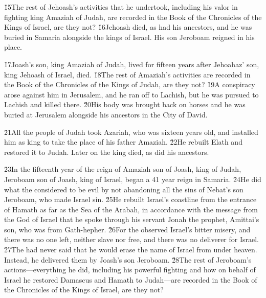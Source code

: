 \v{15}The rest of Jehoash's activities that he undertook, including his valor in fighting king Amaziah of Judah, are recorded in the Book of the Chronicles of the Kings of Israel, are they not? \v{16}Jehoash died, as had his ancestors, and he was buried in Samaria alongside the kings of Israel. His son Jeroboam reigned in his place.

\v{17}Joash's son, king Amaziah of Judah, lived for fifteen years after Jehoahaz' son, king Jehoash of Israel, died. \v{18}The rest of Amaziah's activities are recorded in the Book of the Chronicles of the Kings of Judah, are they not? \v{19}A conspiracy arose against him in Jerusalem, and he ran off to Lachish, but he was pursued to Lachish and killed there. \v{20}His body was brought back on horses and he was buried at Jerusalem alongside his ancestors in the City of David.

\v{21}All the people of Judah took Azariah, who was sixteen years old, and installed him as king to take the place of his father Amaziah. \v{22}He rebuilt Elath and restored it to Judah. Later on the king died, as did his ancestors.

\v{23}In the fifteenth year of the reign of Amaziah son of Joash, king of Judah, Jeroboam son of Joash, king of Israel, began a 41 year reign in Samaria. \v{24}He did what the  considered to be evil by not abandoning all the sins of Nebat's son Jeroboam, who made Israel sin. \v{25}He rebuilt Israel's coastline from the entrance of Hamath as far as the Sea of the Arabah, in accordance with the message from the  God of Israel that he spoke through his servant Jonah the prophet, Amittai's son, who was from Gath-hepher. \v{26}For the  observed Israel's bitter misery, and there was no one left, neither slave nor free, and there was no deliverer for Israel. \v{27}The  had never said that he would erase the name of Israel from under heaven. Instead, he delivered them by Joash's son Jeroboam. \v{28}The rest of Jeroboam's actions---everything he did, including his powerful fighting and how on behalf of Israel he restored Damascus and Hamath to Judah---are recorded in the Book of the Chronicles of the Kings of Israel, are they not?

